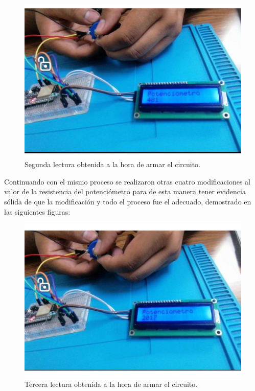                     \begin{figure}[H]
        \centering
        \includegraphics[trim = {50mm 0mm 0mm 0mm},clip,scale=0.3]{19/Img/evidenciaCambio2.pdf}
        \caption{Segunda lectura obtenida a la hora de armar el circuito.}
        \label{fig:evidenciaCambio2}
    \end{figure}
    Continuando con el mismo proceso se realizaron otras cuatro modificaciones al valor de la resistencia del potenciómetro para de esta manera tener evidencia sólida de que la modificación y todo el proceso fue el adecuado, demostrado en las siguientes figuras:
    \begin{figure}[H]
        \centering
        \includegraphics[trim = {50mm 0mm 0mm 0mm},clip,scale=0.3]{19/Img/evidenciaCambio3.pdf}
        \caption{Tercera lectura obtenida a la hora de armar el circuito.}
        \label{fig:evidenciaCambio3}
    \end{figure}

